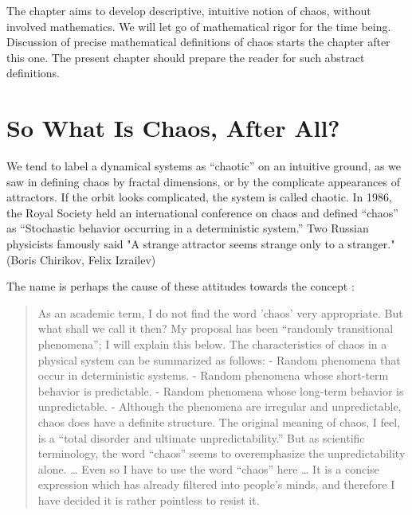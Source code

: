 \documentclass[12pt,twoside,draft]{book}
\begin{document}
The chapter aims to develop descriptive, intuitive notion of chaos, without involved mathematics.
We will let go of mathematical rigor for the time being.
Discussion of precise mathematical definitions of chaos starts the chapter after this one.
The present chapter should prepare the reader for such abstract definitions.

\section{So What Is Chaos, After All?}
We tend to label a dynamical systems as ``chaotic'' on an intuitive ground, as we saw in defining chaos by fractal dimensions, or by the complicate appearances of attractors.
If the orbit looks complicated, the system is called chaotic.
In 1986, the Royal Society held an international conference on chaos and defined ``chaos'' as ``Stochastic behavior occurring in a deterministic system.'' \cite{stewart}
Two Russian physicists famously said "A strange attractor seems strange only to a stranger."
(Boris Chirikov, Felix Izrailev)\cite{lorentzbook}

The name is perhaps the cause of these attitudes towards the concept 
\citep[24]{ueda-abraham}:
\begin{quotation}
  As an academic term, I do not find the word 'chaos' very appropriate.
  But what shall we call it then?
  My proposal has been ``randomly transitional phenomena''; I will explain this below.
  The characteristics of chaos in a physical system can be summarized as follows:
  - Random phenomena that occur in deterministic systems.
  - Random phenomena whose short-term behavior is predictable.
  - Random phenomena whose long-term behavior is unpredictable.
  - Although the phenomena are irregular and unpredictable, chaos does have a definite structure.
  The original meaning of chaos, I feel, is a ``total disorder and ultimate unpredictability.''
  But as scientific terminology, the word ``chaos'' seems to overemphasize the unpredictability alone.
  \ldots
  Even so I have to use the word ``chaos'' here \ldots
  It is a concise expression which has already filtered into people's minds, and therefore I have decided it is rather pointless to resist it.
\end{quotation}
\end{document}

